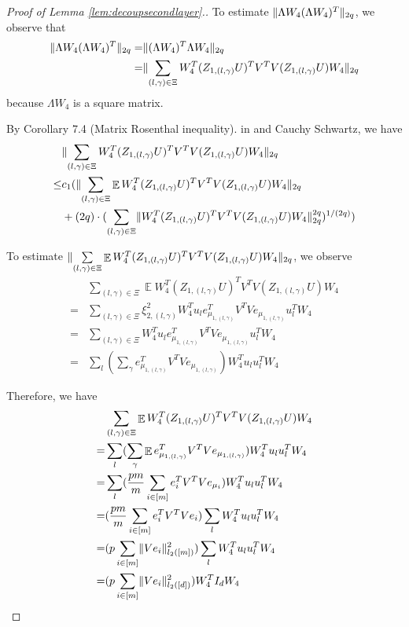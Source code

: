 \documentclass[11pt]{amsart}
\numberwithin{equation}{section}
\numberwithin{equation}{section}
\DeclareMathOperator{\E}{\mathbb{E}}
\DeclarePairedDelimiter{\norm}{\lVert}{\rVert}
\begin{document}
\begin{proof}[Proof of Lemma \ref{lem:decoupsecondlayer}.]
To estimate $\norm{\Lambda W_4(\Lambda W_4)^T}_{2q}$, we observe that
\begin{align*}
    \norm{\Lambda W_4(\Lambda W_4)^T}_{2q}=&\norm{(\Lambda W_4)^T \Lambda W_4}_{2q}
    \\=&\norm{\sum \limits_{(l,\gamma) \in \Xi}W_4^T(Z_{1,(l,\gamma)}U)^TV^TV(Z_{1,(l,\gamma)}U)W_4}_{2q}
\end{align*}
because $\Lambda W_4$ is a square matrix.





By Corollary 7.4 (Matrix Rosenthal inequality). in \cite{mackey2014matrix} and Cauchy Schwartz, we have
\begin{align*}
    &\norm{\sum \limits_{(l,\gamma) \in \Xi}W_4^T(Z_{1,(l,\gamma)}U)^TV^TV(Z_{1,(l,\gamma)}U)W_4}_{2q} \\\le& c_1 (\norm{\sum \limits_{(l,\gamma) \in \Xi}\E W_4^T(Z_{1,(l,\gamma)}U)^TV^TV(Z_{1,(l,\gamma)}U)W_4}_{2q}\\&+(2q)\cdot (\sum \limits_{(l,\gamma) \in \Xi} \norm{W_4^T(Z_{1,(l,\gamma)}U)^TV^TV(Z_{1,(l,\gamma)}U)W_4}_{2q}^{2q})^{1/(2q)})
\end{align*}

To estimate $\norm{\sum \limits_{(l,\gamma) \in \Xi}\E W_4^T(Z_{1,(l,\gamma)}U)^TV^TV(Z_{1,(l,\gamma)}U)W_4}_{2q}$, we observe
\begin{align*}
    &\sum \limits_{(l,\gamma) \in \Xi}\E W_4^T(Z_{1,(l,\gamma)}U)^TV^TV(Z_{1,(l,\gamma)}U)W_4\\=& \sum \limits_{(l,\gamma) \in \Xi}\xi_{2,(l,\gamma)}^2W_4^Tu_le_{\mu_{1,(l,\gamma)}}^TV^TVe_{\mu_{1,(l,\gamma)}}u_l^TW_4
    \\=&\sum \limits_{(l,\gamma) \in \Xi}W_4^Tu_le_{\mu_{1,(l,\gamma)}}^TV^TVe_{\mu_{1,(l,\gamma)}}u_l^TW_4
    \\=&\sum \limits_{l}(\sum \limits_{\gamma}e_{\mu_{1,(l,\gamma)}}^TV^TVe_{\mu_{1,(l,\gamma)}})W_4^Tu_lu_l^TW_4
\end{align*}


Therefore, we have
\begin{align*}
    &\sum \limits_{(l,\gamma) \in \Xi}\E W_4^T(Z_{1,(l,\gamma)}U)^TV^TV(Z_{1,(l,\gamma)}U)W_4\\=&\sum \limits_{l}(\sum \limits_{\gamma}\E e_{\mu_{1,(l,\gamma)}}^TV^TVe_{\mu_{1,(l,\gamma)}})W_4^Tu_lu_l^TW_4
    \\=&\sum \limits_{l}(\frac{pm}{m}\sum \limits_{i \in [m]}e_{{i}}^TV^TVe_{\mu_{i}})W_4^Tu_lu_l^TW_4
    \\=&(\frac{pm}{m}\sum \limits_{i \in [m]}e_{{i}}^TV^TVe_{{i}}) \sum \limits_{l}W_4^Tu_lu_l^TW_4
    \\=&(p\sum \limits_{i \in [m]}\norm{Ve_{{i}}}_{l_2([m])}^2) \sum \limits_{l}W_4^Tu_lu_l^TW_4
    \\=& (p\sum \limits_{i \in [m]}\norm{Ve_{{i}}}_{l_2([d])}^2) W_4^T I_d W_4
\end{align*}


\end{proof}
\end{document}
